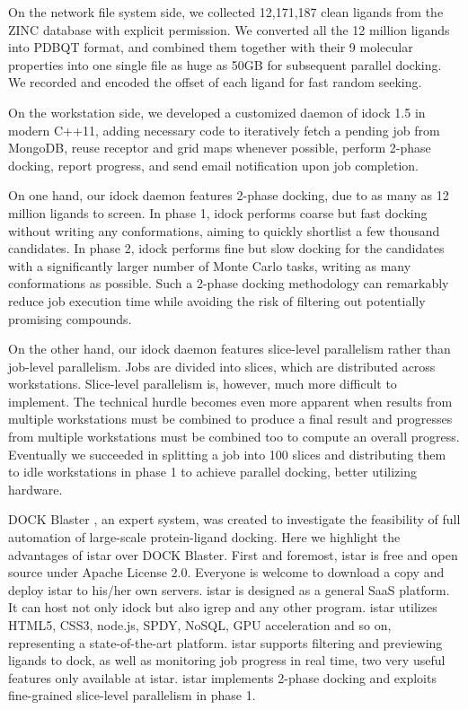 \documentclass{bioinfo}
\begin{document}
On the network file system side, we collected 12,171,187 clean ligands from the ZINC database \citep{532,1178} with explicit permission. We converted all the 12 million ligands into PDBQT format, and combined them together with their 9 molecular properties into one single file as huge as 50GB for subsequent parallel docking. We recorded and encoded the offset of each ligand for fast random seeking.

On the workstation side, we developed a customized daemon of idock 1.5 in modern C++11, adding necessary code to iteratively fetch a pending job from MongoDB, reuse receptor and grid maps whenever possible, perform 2-phase docking, report progress, and send email notification upon job completion.

On one hand, our idock daemon features 2-phase docking, due to as many as 12 million ligands to screen. In phase 1, idock performs coarse but fast docking without writing any conformations, aiming to quickly shortlist a few thousand candidates. In phase 2, idock performs fine but slow docking for the candidates with a significantly larger number of Monte Carlo tasks, writing as many conformations as possible. Such a 2-phase docking methodology can remarkably reduce job execution time while avoiding the risk of filtering out potentially promising compounds.

On the other hand, our idock daemon features slice-level parallelism rather than job-level parallelism. Jobs are divided into slices, which are distributed across workstations. Slice-level parallelism is, however, much more difficult to implement. The technical hurdle becomes even more apparent when results from multiple workstations must be combined to produce a final result and progresses from multiple workstations must be combined too to compute an overall progress. Eventually we succeeded in splitting a job into 100 slices and distributing them to idle workstations in phase 1 to achieve parallel docking, better utilizing hardware.

DOCK Blaster \citep{557}, an expert system, was created to investigate the feasibility of full automation of large-scale protein-ligand docking. Here we highlight the advantages of istar over DOCK Blaster. First and foremost, istar is free and open source under Apache License 2.0. Everyone is welcome to download a copy and deploy istar to his/her own servers. istar is designed as a general SaaS platform. It can host not only idock but also igrep and any other program. istar utilizes HTML5, CSS3, node.js, SPDY, NoSQL, GPU acceleration and so on, representing a state-of-the-art platform. istar supports filtering and previewing ligands to dock, as well as monitoring job progress in real time, two very useful features only available at istar. istar implements 2-phase docking and exploits fine-grained slice-level parallelism in phase 1.
\end{document}
